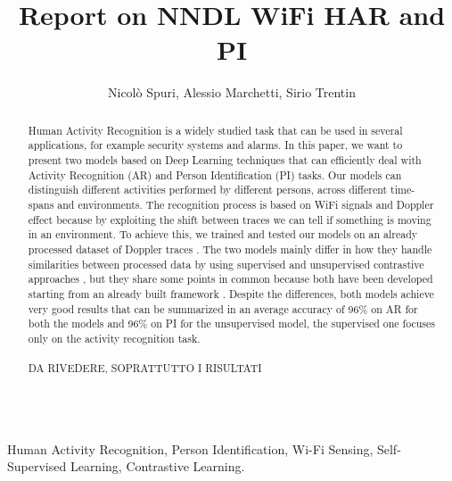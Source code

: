 \documentclass[10pt, conference, letterpaper]{IEEEtran}
\title{Report on NNDL WiFi HAR and PI}
\author{Nicolò Spuri, Alessio Marchetti, Sirio Trentin\dag}
\begin{document}
\maketitle

\begin{abstract}
  Human Activity Recognition is a widely studied task that can be used in several applications, for example security systems and alarms.
  In this paper, we want to present two models based on Deep Learning techniques that can efficiently deal with Activity Recognition (AR) and Person Identification (PI) tasks.
  Our models can distinguish different activities performed by different persons, across different time-spans and environments.
  The recognition process is based on WiFi signals and Doppler effect because by exploiting the shift between traces we can tell if something is moving in an environment.
  To achieve this, we trained and tested our models on an already processed dataset of Doppler traces \cite{dataset} \cite{data}.
  The two models mainly differ in how they handle similarities between processed data by using supervised and unsupervised contrastive approaches \cite{supcon}, but they share some points in common because both have been developed starting from an already built framework \cite{sharp}.
  Despite the differences, both models achieve very good results that can be summarized in an average accuracy of 96\% on AR for both the models and 96\% on PI for the unsupervised model, the supervised one focuses only on the activity recognition task.
  \\\\
  DA RIVEDERE, SOPRATTUTTO I RISULTATI
  \\\\
\end{abstract}

\begin{IEEEkeywords}
  Human Activity Recognition, Person Identification, Wi-Fi Sensing, Self-Supervised Learning, Contrastive Learning.
\end{IEEEkeywords}













\end{document}
